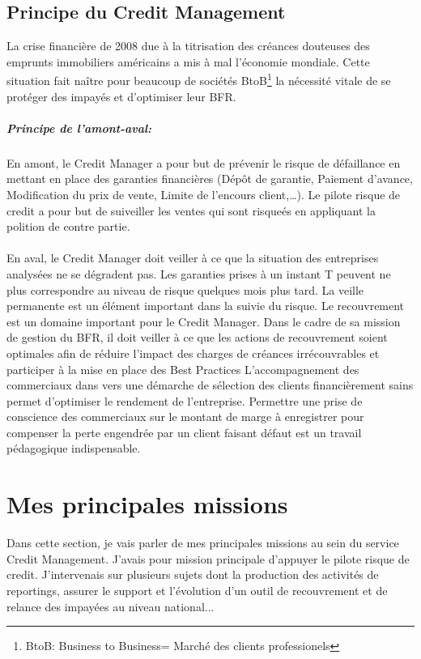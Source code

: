 \documentclass[11pt,a4paper]{article}
\begin{document}
\subsection{Principe du Credit Management}
La crise financière de 2008 due à la titrisation des créances douteuses des emprunts immobiliers américains a mis à mal l’économie mondiale. Cette situation fait naître pour beaucoup de sociétés BtoB\footnote{BtoB: Business to Business= Marché des clients professionels} la nécessité vitale de se protéger des impayés et d’optimiser leur BFR.
\subparagraph{Principe de l'amont-aval:}
En amont, le Credit Manager a pour but de prévenir le risque de défaillance en mettant en place des garanties financières (Dépôt de garantie, Paiement d’avance, Modification du prix de vente, Limite de l’encours client,…). Le pilote risque de credit a pour but de suiveiller les ventes qui sont risqueés  en appliquant la polition de contre partie. \\\\
En aval, le Credit Manager doit veiller à ce que la situation des entreprises analysées ne se dégradent pas. Les garanties prises à un instant T peuvent ne plus correspondre au niveau de risque quelques mois plus tard. La veille permanente est un élément important dans la suivie du risque. 
Le recouvrement est un domaine important pour le Credit Manager. Dans le cadre de sa mission de gestion du BFR, il doit veiller à ce que les actions de recouvrement soient optimales afin de réduire l’impact des charges de créances irrécouvrables et participer à la mise en place des Best Practices
L’accompagnement des commerciaux dans vers une démarche de sélection des clients financièrement sains permet d’optimiser le rendement de l’entreprise. 
Permettre une prise de conscience des commerciaux sur le montant de marge à enregistrer pour compenser la perte engendrée par un client faisant défaut est un travail pédagogique indispensable. 

\section{Mes principales missions}

Dans cette section, je vais parler de mes principales missions au sein du service Credit Management. J'avais pour mission principale d'appuyer le pilote risque de credit. J'intervenais sur plusieurs sujets dont la production des activités de reportings, assurer le support et l'évolution  d'un outil de recouvrement et de relance des impayées au niveau national... 
\end{document}
